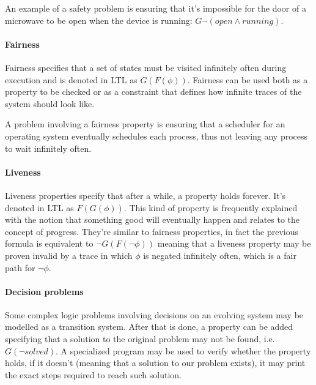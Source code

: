 An example of a safety problem is ensuring that it's impossible for the door of a microwave to be open when the device is running:
\begin{math}
    G \lnot (open \land running)
\end{math}.

\paragraph*{Fairness} Fairness specifies that a set of states must be visited infinitely often during execution and is denoted in LTL as \begin{math} G(F(\phi))\end{math}.
Fairness can be used both as a property to be checked or as a constraint that defines how infinite traces of the system should look like.

A problem involving a fairness property is ensuring that a scheduler for an operating system eventually schedules each process, thus not leaving any process to wait infinitely often.

\paragraph*{Liveness} Liveness properties specify that after a while, a property holds forever. It's denoted in LTL as \begin{math} F(G(\phi)) \end{math}.
This kind of property is frequently explained with the notion that something good will eventually happen and relates to the concept of progress.
They're similar to fairness properties, in fact the previous formula is equivalent to \begin{math} \lnot G(F(\lnot \phi))\end{math} meaning that a liveness property may be proven invalid by a trace in which \begin{math} \phi \end{math} is negated infinitely often, which is a fair path for \begin{math}\lnot \phi\end{math}.

\paragraph*{Decision problems} Some complex logic problems involving decisions on an evolving system may be modelled as a transition system.
After that is done, a property can be added specifying that a solution to the original problem may not be found, i.e. \begin{math} G (\lnot solved) \end{math}.
A specialized program may be used to verify whether the property holds, if it doesn't (meaning that a solution to our problem exists), it may print the exact steps required to reach such solution.

